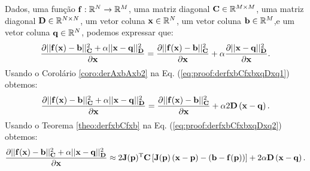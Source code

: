 \begin{myproofT}\label{proof:theo:derfxbCfxbxqDxq}
Dados,
uma função $\VECTOR{f}:\mathbb{R}^{N} \rightarrow \mathbb{R}^{M}$, 
uma matriz diagonal $\MATRIX{C}\in \mathbb{R}^{M\times M}$, 
uma matriz diagonal $\MATRIX{D}\in \mathbb{R}^{N\times N}$, 
um vetor coluna $\VECTOR{x}\in \mathbb{R}^{N}$, 
um vetor coluna $\VECTOR{b}\in \mathbb{R}^{M}$,e 
um vetor coluna $\VECTOR{q}\in \mathbb{R}^{N}$, 
podemos expressar que:
\begin{equation}\label{eq:proof:derfxbCfxbxqDxq1}
\frac{\partial ||\VECTOR{f}(\VECTOR{x})-\VECTOR{b}||_{\MATRIX{C}}^2 +\alpha||\VECTOR{x}-\VECTOR{q}||_{\MATRIX{D}}^2}{\partial \VECTOR{x}} =
\frac{\partial ||\VECTOR{f}(\VECTOR{x})-\VECTOR{b}||_{\MATRIX{C}}^2}{\partial \VECTOR{x}}+
\alpha \frac{\partial ||\VECTOR{x}-\VECTOR{q}||_{\MATRIX{D}}^2}{\partial \VECTOR{x}}.
\end{equation}
Usando o Corolário \ref{coro:derAxbAxb2} na Eq. (\ref{eq:proof:derfxbCfxbxqDxq1})
obtemos:
\begin{equation}\label{eq:proof:derfxbCfxbxqDxq2}
\frac{\partial ||\VECTOR{f}(\VECTOR{x})-\VECTOR{b}||_{\MATRIX{C}}^2 +\alpha||\VECTOR{x}-\VECTOR{q}||_{\MATRIX{D}}^2}{\partial \VECTOR{x}} =
\frac{\partial ||\VECTOR{f}(\VECTOR{x})-\VECTOR{b}||_{\MATRIX{C}}^2}{\partial \VECTOR{x}}+
\alpha 2 \MATRIX{D}\left(\VECTOR{x}-\VECTOR{q}\right).
\end{equation}
Usando o Teorema \ref{theo:derfxbCfxb} na Eq. (\ref{eq:proof:derfxbCfxbxqDxq2})
obtemos:
\begin{equation}\label{eq:proof:derfxbCfxbxqDxq3}
\frac{\partial ||\VECTOR{f}(\VECTOR{x})-\VECTOR{b}||_{\MATRIX{C}}^2 +\alpha||\VECTOR{x}-\VECTOR{q}||_{\MATRIX{D}}^2}{\partial \VECTOR{x}} \approx
2 \MATRIX{J}(\VECTOR{p})^{\transpose}\MATRIX{C}\left[\MATRIX{J}(\VECTOR{p})\left(\VECTOR{x} - \VECTOR{p}\right)-\left(\VECTOR{b}-\VECTOR{f}(\VECTOR{p})\right)\right]+
2 \alpha \MATRIX{D}\left(\VECTOR{x}-\VECTOR{q}\right).
\end{equation}
\end{myproofT}
%